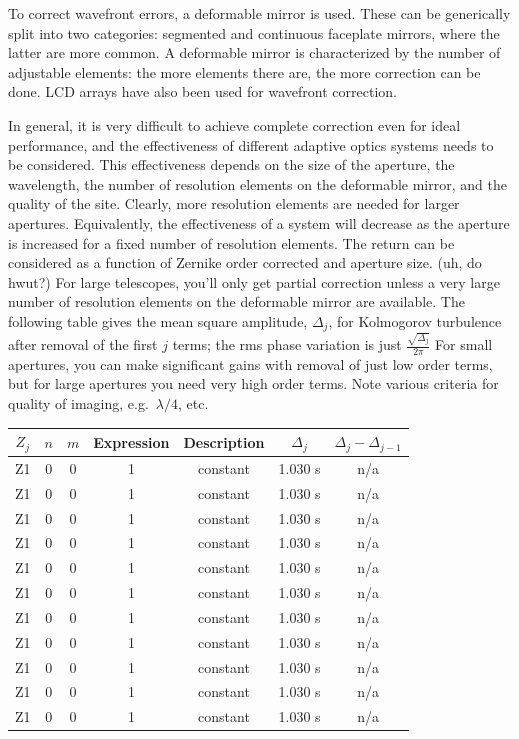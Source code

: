 \documentclass[12pt]{article}
\begin{document}
To correct wavefront errors, a deformable mirror is used.
These can be generically split into two categories:
segmented and continuous faceplate mirrors,
where the latter are more common.
A deformable mirror is characterized by the number of adjustable
elements: the more elements there are, the more correction can be done.
LCD arrays have also been used for wavefront correction.

In general, it is very difficult to achieve complete correction even
for ideal performance, and the effectiveness of
different adaptive optics systems needs to be considered.
This effectiveness depends on the
size of the aperture, the wavelength, the number of resolution
elements on the deformable mirror, and the quality of the site.
Clearly, more resolution elements are needed for larger apertures.
Equivalently, the effectiveness of a system will decrease as the
aperture is increased for a fixed number of resolution elements.
The return can be considered as a function of Zernike order corrected and
aperture size. (\textcolor{myBlue}{uh, do hwut?})
For large telescopes, you'll only get partial
correction unless a very large number of resolution elements on the
deformable mirror are available. The following table gives the mean
square amplitude, $\Delta_{j}$, for Kolmogorov turbulence after
removal of the first $j$ terms; the rms phase variation is just
$ \frac{\sqrt{\Delta_j}}{2\pi}  $
For small apertures, you can make
significant gains with removal of just low order terms, but for large
apertures you need very high order terms. Note various criteria for
quality of imaging, e.g.\ $\lambda/4$, etc.

\newpage
\begin{table}[th]
\centering
\begin{tabular}{c c c c c c c}
    $Z_j$ & $n$ & $m$ & Expression & Description &
    $\Delta_j$ & $\Delta_j - \Delta_{j-1}$\\
    \hline\hline
    Z1 & 0 & 0 & 1 & constant & 1.030 s & n/a\\
    Z1 & 0 & 0 & 1 & constant & 1.030 s & n/a\\
    Z1 & 0 & 0 & 1 & constant & 1.030 s & n/a\\
    Z1 & 0 & 0 & 1 & constant & 1.030 s & n/a\\
    Z1 & 0 & 0 & 1 & constant & 1.030 s & n/a\\
    Z1 & 0 & 0 & 1 & constant & 1.030 s & n/a\\
    Z1 & 0 & 0 & 1 & constant & 1.030 s & n/a\\
    Z1 & 0 & 0 & 1 & constant & 1.030 s & n/a\\
    Z1 & 0 & 0 & 1 & constant & 1.030 s & n/a\\
    Z1 & 0 & 0 & 1 & constant & 1.030 s & n/a\\
    Z1 & 0 & 0 & 1 & constant & 1.030 s & n/a\\
    \hline
    \end{tabular}
\end{table}
\end{document}
